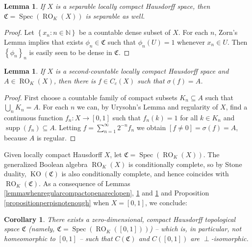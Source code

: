 \documentclass[letter,11pt]{amsart}
\theoremstyle{plain}		\newtheorem{theorem}[generalnumbering]{Theorem}
\theoremstyle{plain}		\newtheorem{corollary}[generalnumbering]{Corollary}
\theoremstyle{definition}		\newtheorem{definition}[generalnumbering]{Definition}
\theoremstyle{definition}		\newtheorem{example}[generalnumbering]{Example}
\theoremstyle{plain}		\newtheorem{proposition}[generalnumbering]{Proposition}
\theoremstyle{plain}		\newtheorem{lemma}[generalnumbering]{Lemma}
\theoremstyle{plain}    \newtheorem{plainstyle}[generalnumbering]{\namefordifferentenvironment}
\theoremstyle{plain}    \newtheorem*{plainstyle*}{\namefordifferentenvironment}
\theoremstyle{definition}    \newtheorem{definitionstyle}[generalnumbering]{\namefordifferentenvironment}
\theoremstyle{definition}    \newtheorem*{definitionstyle*}{\namefordifferentenvironment}
\DeclareMathOperator{\supp}{supp}
\begin{document}
\begin{lemma}\label{gprokseparableisseparable}
	If $X$ is a separable locally compact Hausdorff space, then $\mathfrak{C}=\operatorname{Spec}(\operatorname{RO}_K(X))$ is separable as well.
\end{lemma}
\begin{proof}
	Let $\left\{x_n:n\in\mathbb{N}\right\}$ be a countable dense subset of $X$. For each $n$, Zorn's Lemma implies that exists $\phi_n\in\mathfrak{C}$ such that $\phi_n(U)=1$ whenever $x_n\in U$. Then $\left\{\phi_n\right\}_n$ is easily seen to be dense in $\mathfrak{C}$.\qedhere
\end{proof}

\begin{lemma}\label{lemmaregularopeninsecondcountableissigma}
	If $X$ is a second-countable locally compact Hausdorff space and $A\in\operatorname{RO}_K(X)$, then there is $f\in C_c(X)$ such that $\sigma(f)=A$.
\end{lemma}
\begin{proof}
	First choose a countable family of compact subsets $K_n\subseteq A$ such that $\bigcup_nK_n=A$. For each $n$ we can, by Urysohn's Lemma and regularity of $X$, find a continuous function $f_n\colon X\to[0,1]$ such that $f_n(k)=1$ for all $k\in K_n$ and $\supp(f_n)\subseteq A$. Letting $f=\sum_{n=1}^\infty 2^{-n}f_n$ we obtain $[f\neq 0]=\sigma(f)=A$, because $A$ is regular.
\end{proof}

Given locally compact Hausdorff $X$, let $\mathfrak{C}=\operatorname{Spec}(\operatorname{RO}_K(X))$. The generalized Boolean algebra $\operatorname{RO}_K(X)$ is conditionally complete, so by Stone duality, $\operatorname{KO}(\mathfrak{C})$ is also conditionally complete, and hence coincides with $\operatorname{RO}_K(\mathfrak{C})$. As a consequence of Lemmas \ref{lemmawhenregularcompactopenareclopen}, \ref{gprokseparableisseparable} and \ref{lemmaregularopeninsecondcountableissigma} and Proposition \ref{propositionperpisnotenough} when $X=[0,1]$, we conclude:

\begin{corollary}\label{corollary01stoneperp}
	There exists a zero-dimensional, compact Hausdorff topological space $\mathfrak{C}$ (namely, $\mathfrak{C}=\operatorname{Spec}(\operatorname{RO}_K([0,1]))$) -- which is, in particular, not homeomorphic to $[0,1]$ -- such that $C(\mathfrak{C})$ and $C([0,1])$ are $\perp$-isomorphic.
\end{corollary}
\end{document}
